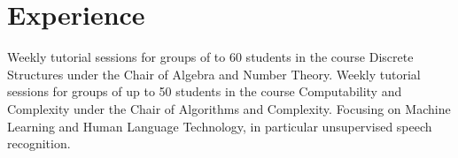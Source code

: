 \section{Experience}
{Weekly tutorial sessions for groups of to 60 students in the course Discrete Structures under the Chair of Algebra and Number Theory.\newline{}}
{Weekly tutorial sessions for groups of up to 50 students in the course Computability and Complexity under the Chair of Algorithms and Complexity.\newline{}}
{Focusing on Machine Learning and Human Language Technology, in particular unsupervised speech recognition.\newline{}}
